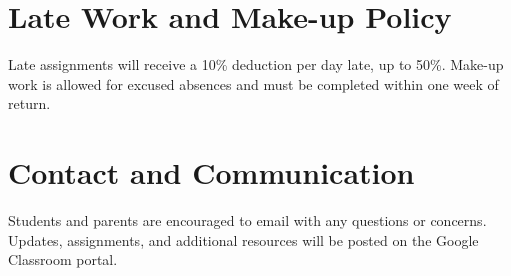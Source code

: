 \documentclass[12pt]{article}
\begin{document}
\section*{Late Work and Make-up Policy}
Late assignments will receive a 10\% deduction per day late, up to 50\%. Make-up work is allowed for excused absences and must be completed within one week of return.

\section*{Contact and Communication}
Students and parents are encouraged to email with any questions or concerns. Updates, assignments, and additional resources will be posted on the Google Classroom portal.
\end{document}

